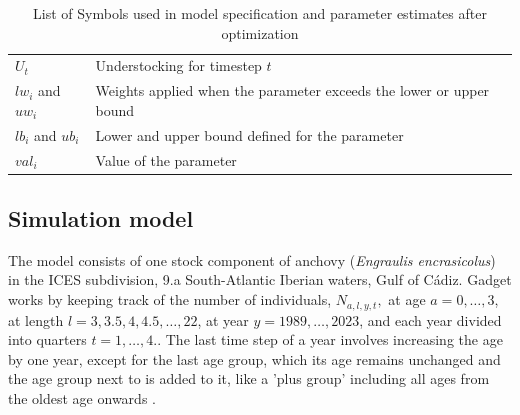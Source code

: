 \documentclass[review]{elsarticle}
\begin{document}
\begin{table}[h]
\begin{tabular}{|l|l l|}
$U_{t}$  & Understocking for  timestep $t$ \\

$lw_i$ and $uw_i$   &  Weights applied when the parameter exceeds the lower or upper bound         \\

$lb_i$ and $ ub_i $  &  Lower and upper bound defined for the parameter \\

$val_i $    &   Value of the parameter           \\

 

\hline

\end{tabular}

\caption{List of Symbols used in model specification and parameter estimates after optimization}

\end{table}




% 
% 
% 
% 




\subsection{Simulation model}

The model consists of one stock component of anchovy (\textit{Engraulis encrasicolus}) in the ICES subdivision, 9.a South-Atlantic Iberian waters, Gulf of Cádiz. Gadget works by keeping track of the number of individuals, $N_{a,l,y,t},$ at age $a = 0, \dots,3$, at length $l = 3,3.5,4,4.5, \dots,22$, at year $y=1989,\dots,2023$, and each year divided into quarters $t =1, \dots, 4.$. The last time step of a year involves increasing the age by one year, except for the last age group, which its age remains unchanged and the age group next to is added to it, like a 'plus group' including all ages from the oldest age onwards \citep{taylor_simple_2007}.
\end{document}
